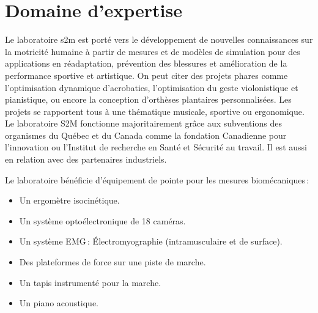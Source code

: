         \section{Domaine d'expertise}
        
Le laboratoire s2m est porté vers le développement de nouvelles connaissances sur la motricité humaine à
partir de mesures et de modèles de simulation pour des applications en réadaptation, prévention des
blessures et amélioration de la performance sportive et artistique. On peut citer des projets phares comme l'optimisation dynamique d'acrobaties, l'optimisation du geste violonistique et pianistique, ou encore la conception d’orthèses plantaires personnalisées. Les projets se rapportent tous à une thématique musicale, sportive ou ergonomique.
Le laboratoire S2M fonctionne majoritairement grâce aux subventions des organismes du
Québec et du Canada comme la fondation Canadienne pour l’innovation ou l’Institut de recherche en
Santé et Sécurité au travail. Il est aussi en relation avec des partenaires industriels. %


Le laboratoire bénéficie d’équipement de pointe pour les mesures biomécaniques : 
\begin{itemize}
\setlength\itemsep{-0.5em}
\item Un ergomètre isocinétique.
\item Un système optoélectronique de 18 caméras.
\item Un système EMG : Électromyographie (intramusculaire et de surface).
\item Des plateformes de force sur une piste de marche.
\item Un tapis instrumenté pour la marche.
\item Un piano acoustique.  
\end{itemize}
\newpage

    

